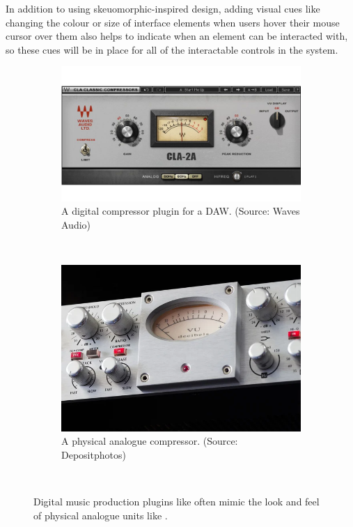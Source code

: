 In addition to using skeuomorphic-inspired design, adding visual cues like changing the colour or size of interface elements when users hover their mouse cursor over them also helps to indicate when an element can be interacted with, so these cues will be in place for all of the interactable controls in the system.

\begin{figure}[htb] 
    \centering
    \begin{subfigure}[b]{0.45\textwidth}
        \includegraphics[width=\textwidth]{images/design/compressor-digital.png}
        \caption{A digital compressor plugin for a DAW. (Source: Waves Audio)}
        \label{fig:compressor-digital}
    \end{subfigure}
    ~
    \begin{subfigure}[b]{0.45\textwidth}
        \includegraphics[width=\textwidth]{images/design/compressor-analogue.png}
        \caption{A physical analogue compressor. (Source: Depositphotos)}
        \label{fig:compressor-analogue}
    \end{subfigure}
    ~
    \caption{
    Digital music production plugins like  often mimic the look and feel of physical analogue units like . 
    }\label{fig:compressor}
\end{figure}

